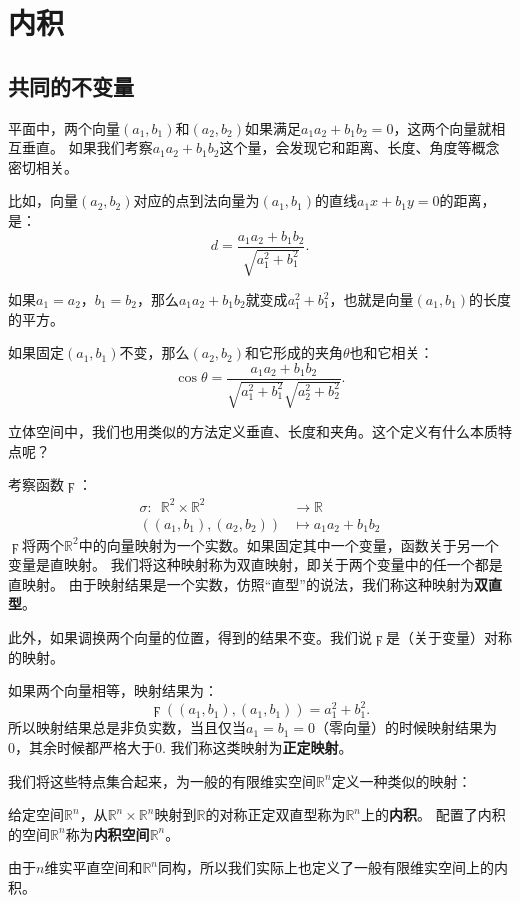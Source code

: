 \documentclass[12pt,UTF8]{ctexbook}
\begin{document}
\section{内积}
\subsection{共同的不变量}
平面中，两个向量$(a_1, b_1)$和$(a_2, b_2)$如果满足$a_1a_2 + b_1b_2 = 0$，这两个向量就相互垂直。
如果我们考察$a_1a_2 + b_1b_2$这个量，会发现它和距离、长度、角度等概念密切相关。

比如，向量$(a_2, b_2)$对应的点到法向量为$(a_1, b_1)$的直线$a_1x + b_1y = 0$的距离，是：
$$ d = \frac{a_1a_2 + b_1b_2}{\sqrt{a_1^2 + b_1^2}}. $$

如果$a_1 = a_2$，$b_1 = b_2$，那么$ a_1a_2 + b_1b_2$就变成$a_1^2 + b_1^2$，也就是向量$(a_1, b_1)$的长度的平方。

如果固定$(a_1, b_1)$不变，那么$(a_2, b_2)$和它形成的夹角$\theta$也和它相关：
$$ \cos \theta = \frac{a_1a_2 + b_1b_2}{\sqrt{a_1^2 + b_1^2}\sqrt{a_2^2 + b_2^2}}. $$

立体空间中，我们也用类似的方法定义垂直、长度和夹角。这个定义有什么本质特点呢？

考察函数$\digamma$：
\begin{align*}
    \sigma: \,\,\,\mathbb{R}^2 \times \mathbb{R}^2 &\rightarrow \mathbb{R}  \\
    \left((a_1, b_1) , (a_2, b_2)\right) &\mapsto a_1a_2 + b_1b_2 
\end{align*}
$\digamma$将两个$\mathbb{R}^2$中的向量映射为一个实数。如果固定其中一个变量，函数关于另一个变量是直映射。
我们将这种映射称为双直映射，即关于两个变量中的任一个都是直映射。
由于映射结果是一个实数，仿照“直型”的说法，我们称这种映射为\textbf{双直型}。

此外，如果调换两个向量的位置，得到的结果不变。我们说$\digamma$是（关于变量）对称的映射。

如果两个向量相等，映射结果为：
$$\digamma\left((a_1, b_1) , (a_1, b_1)\right) = a_1^2 + b_1^2.$$
所以映射结果总是非负实数，当且仅当$a_1 = b_1 = 0$（零向量）的时候映射结果为0，其余时候都严格大于0.
我们称这类映射为\textbf{正定映射}。

我们将这些特点集合起来，为一般的有限维实空间$\mathbb{R}^n$定义一种类似的映射：

\begin{df}\label{df:7_1}
    给定空间$\mathbb{R}^n$，从$\mathbb{R}^n \times \mathbb{R}^n$映射到$\mathbb{R}$的对称正定双直型称为$\mathbb{R}^n$上的\textbf{内积}。
    配置了内积的空间$\mathbb{R}^n$称为\textbf{内积空间}$\mathbb{R}^n$。
\end{df}
由于$n$维实平直空间和$\mathbb{R}^n$同构，所以我们实际上也定义了一般有限维实空间上的内积。
\end{document}
